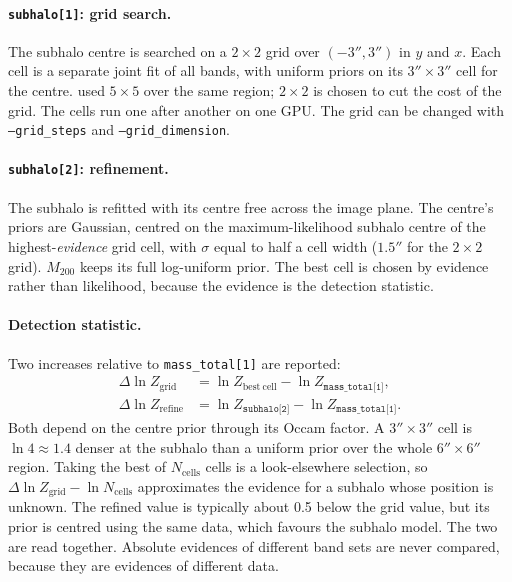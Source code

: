 \paragraph{\texttt{subhalo[1]}: grid search.} The subhalo centre is searched on a $2 \times 2$ grid
over $(-3'', 3'')$ in $y$ and $x$. Each cell is a separate joint fit of all bands, with uniform
priors on its $3'' \times 3''$ cell for the centre. \citet{Nightingale2024} used $5 \times 5$ over
the same region; $2 \times 2$ is chosen to cut the cost of the grid. The cells run one after another
on one GPU. The grid can be changed with \texttt{--grid\_steps} and \texttt{--grid\_dimension}.

\paragraph{\texttt{subhalo[2]}: refinement.} The subhalo is refitted with its centre free across the
image plane. The centre's priors are Gaussian, centred on the maximum-likelihood subhalo centre of the
highest-\emph{evidence} grid cell, with $\sigma$ equal to half a cell width ($1.5''$ for the
$2 \times 2$ grid). $M_{200}$ keeps its full log-uniform prior. The best cell is chosen by evidence
rather than likelihood, because the evidence is the detection statistic.

\paragraph{Detection statistic.} Two increases relative to \texttt{mass\_total[1]} are reported:
\begin{align}
    \Delta \ln Z_\mathrm{grid} &= \ln Z_\mathrm{best\ cell} - \ln Z_{\texttt{mass\_total[1]}}, \\
    \Delta \ln Z_\mathrm{refine} &= \ln Z_{\texttt{subhalo[2]}} - \ln Z_{\texttt{mass\_total[1]}}.
\end{align}
Both depend on the centre prior through its Occam factor. A $3'' \times 3''$ cell is $\ln 4 \approx
1.4$ denser at the subhalo than a uniform prior over the whole $6'' \times 6''$ region. Taking the
best of $N_\mathrm{cells}$ cells is a look-elsewhere selection, so
$\Delta \ln Z_\mathrm{grid} - \ln N_\mathrm{cells}$ approximates the evidence for a subhalo whose
position is unknown. The refined value is typically about 0.5 below the grid value, but its prior is
centred using the same data, which favours the subhalo model. The two are read together. Absolute
evidences of different band sets are never compared, because they are evidences of different data.

